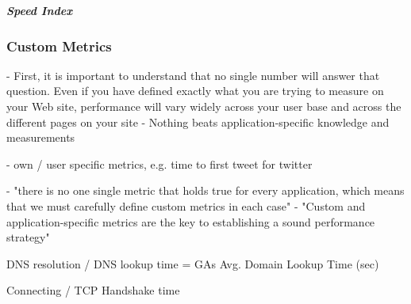 \subparagraph{Speed Index}



















\subsubsection{Custom Metrics}


- First, it is important to understand that no single number will answer that question. Even if you have defined exactly what you are trying to measure on your Web site, performance will vary widely across your user base and across the different pages on your site
- Nothing beats application-specific knowledge and measurements

- own / user specific metrics, e.g. time to first tweet for twitter 


- "there is no one single metric that holds true for every application, which means that we must carefully define custom metrics in each case"
-  "Custom and application-specific metrics are the key to establishing a sound performance strategy"

















DNS resolution / DNS lookup time %
= GAs Avg. Domain Lookup Time (sec) %


Connecting / TCP Handshake time %


